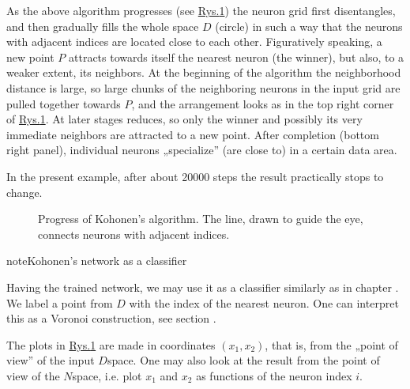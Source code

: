\documentclass[a4paper,12pt,polish]{jupyterBook}
\let\sphinxpxdimen\pdfpxdimen\else\newdimen\sphinxpxdimen
\begin{document}
\sphinxAtStartPar
As the above algorithm progresses (see \hyperref[\detokenize{docs/som:kohstory-fig}]{Rys.\@ \ref{\detokenize{docs/som:kohstory-fig}}}) the neuron grid first disentangles, and then gradually fills the whole space \(D\) (circle) in such a way that the neurons with adjacent indices are located close to each other.
Figuratively speaking, a new point \(P\) attracts towards itself the nearest neuron (the winner), but also, to a weaker extent, its neighbors. At the beginning of the algorithm the neighborhood distance  is large, so large chunks of the neighboring neurons in the input grid are pulled together towards \(P\), and the arrangement looks as in the top right corner of \hyperref[\detokenize{docs/som:kohstory-fig}]{Rys.\@ \ref{\detokenize{docs/som:kohstory-fig}}}. At later stages  reduces, so only the winner and possibly its very immediate neighbors are attracted to a new point.
After completion (bottom right panel), individual neurons „specialize” (are close to) in a certain data area.

\sphinxAtStartPar
In the present example, after about 20000 steps the result practically stops to change.

\begin{figure}[htbp]
\centering
\capstart

\noindent\sphinxincludegraphics[width=800\sphinxpxdimen]{{kaall}.png}
\caption{Progress of Kohonen’s algorithm. The line, drawn to guide the eye, connects neurons with adjacent indices.}\label{\detokenize{docs/som:kohstory-fig}}\end{figure}

\begin{sphinxadmonition}{note}{Kohonen’s network as a classifier}

\sphinxAtStartPar
Having the trained network, we may use it as a classifier similarly as in chapter {\hyperref[\detokenize{docs/unsupervised:un-lab}]{}}. We label a point from \(D\) with the index of the nearest neuron. One can interpret this as a Voronoi construction, see section {\hyperref[\detokenize{docs/unsupervised:vor-lab}]{}}.
\end{sphinxadmonition}

\sphinxAtStartPar
The plots in \hyperref[\detokenize{docs/som:kohstory-fig}]{Rys.\@ \ref{\detokenize{docs/som:kohstory-fig}}} are made in coordinates \((x_1,x_2)\), that is, from the „point of view” of the input \(D\)\sphinxhyphen{}space. One may also look at the result from the point of view of the \(N\)\sphinxhyphen{}space, i.e. plot \(x_1\) and \(x_2\) as functions of the neuron index \(i\).
\end{document}
